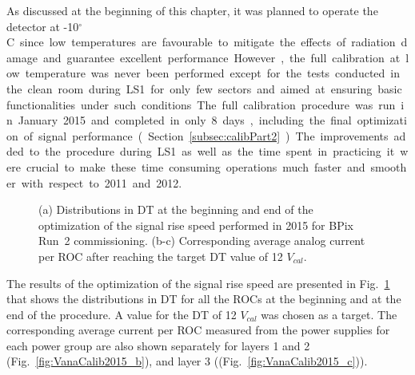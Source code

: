 As discussed at the beginning of this chapter, it was planned to operate the detector at -10\unit{$^\circ$C} since low temperatures
are favourable to mitigate the effects of radiation damage and guarantee excellent performance.
However, the full calibration at low temperature was never been performed except for the tests conducted in the clean room during LS1
for only few sectors and aimed at ensuring basic functionalities under such conditions.
The full calibration procedure was run in January 2015 and completed in only 8 days, including the final optimization of signal performance (Section~\ref{subsec:calibPart2}).
The improvements added to the procedure during LS1 as well as the time spent in practicing it 
were crucial to make these time consuming operations much faster and smoother with respect to 2011 and 2012.

\begin{figure}[!htb]
 \begin{center}
 \end{center}
 \caption{(a) Distributions in DT at the beginning and end of the optimization of the signal rise speed performed in 2015 for BPix Run~2 commissioning. (b-c) Corresponding average analog current per ROC after reaching the target DT value of 12 $V_{cal}$.}
 \label{fig:VanaCalib2015}
\end{figure}

The results of the optimization of the signal rise speed are presented in Fig.~\ref{fig:VanaCalib2015} that shows the 
distributions in DT for all the ROCs at the beginning and at the end of the procedure. A value for the DT of 12 $V_{cal}$ was chosen as a target.
The corresponding average current per ROC measured from the power supplies for each power group are also shown separately for layers 1 and 2 (Fig.~\ref{fig:VanaCalib2015_b}), and layer 3 ((Fig.~\ref{fig:VanaCalib2015_c})).


